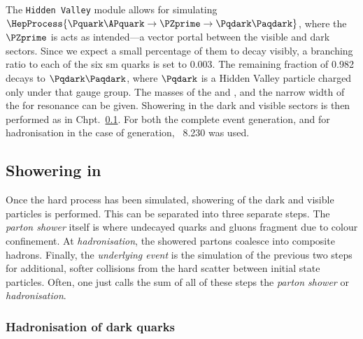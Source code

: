 The \texttt{Hidden Valley} module allows for simulating $\HepProcess{\Pquark\APquark \to \PZprime \to \Pqdark\Paqdark}$, where the $\PZprime$ is acts as intended---a vector portal between the visible and dark sectors. Since we expect a small percentage of them to decay visibly, a branching ratio to each of the six \acrshort{sm} quarks is set to 0.003. The remaining fraction of 0.982 decays to $\Pqdark\Paqdark$, where $\Pqdark$ is a Hidden Valley particle charged only under that gauge group. The masses of the \PZprime and \Pqdark, and the narrow width of the \PZprime for resonance can be given. Showering in the dark and visible sectors is then performed as in Chpt.~\ref{subsec:svj_showering_pythia}. For both the complete event generation, and for hadronisation in the case of \MADGRAPH generation, \PYTHIA~8.230 was used.




\subsection{Showering in \texorpdfstring{\PYTHIA}{Pythia}}
\label{subsec:svj_showering_pythia}

Once the hard process has been simulated, showering of the dark and visible particles is performed. This can be separated into three separate steps. The \emph{parton shower} itself is where undecayed quarks and gluons fragment due to colour confinement. At \emph{hadronisation}, the showered partons coalesce into composite hadrons. Finally, the \emph{underlying event} is the simulation of the previous two steps for additional, softer collisions from the hard scatter between initial state particles. Often, one just calls the sum of all of these steps the \emph{parton shower} or \emph{hadronisation}.




\subsubsection{Hadronisation of dark quarks}
\label{subsubsec:svj_dark_hadronisation}


